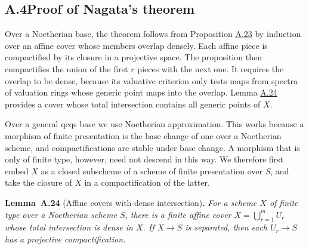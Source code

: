 \documentclass[11pt]{article}
\newenvironment{bpstatement}[2]{\par\addvspace{0.6\baselineskip}\noindent\textbf{#1}#2\textbf{.}\enspace\ignorespaces}
  {\par\addvspace{0.4\baselineskip}}
\newenvironment{bpstatementit}[2]{\begin{bpstatement}{#1}{#2}\itshape\ignorespaces}{\end{bpstatement}}
\begin{document}
\subsection*{\texorpdfstring{A.4\quad Proof of Nagata's theorem}{A.4 Proof of Nagata's theorem}}
\label{bp65}%
\label{bp66}%
Over a Noetherian base, the theorem follows from Proposition \hyperref[bp63]{A.23} by induction over an affine cover whose members overlap densely. Each affine piece is compactified by its closure in a projective space. The proposition then compactifies the union of the first \(r\) pieces with the next one. It requires the overlap to be dense, because its valuative criterion only tests maps from spectra of valuation rings whose generic point maps into the overlap. Lemma \hyperref[bp67]{A.24} provides a cover whose total intersection contains all generic points of \(X\).

Over a general qcqs base we use Noetherian approximation. This works because a morphism of finite presentation is the base change of one over a Noetherian scheme, and compactifications are stable under base change. A morphism that is only of finite type, however, need not descend in this way. We therefore first embed \(X\) as a closed subscheme of a scheme of finite presentation over \(S\), and take the closure of \(X\) in a compactification of the latter.

\label{bp67}%
\begin{bpstatementit}{Lemma~A.24}{ (Affine covers with dense intersection)}
For a scheme \(X\) of finite type over a Noetherian scheme \(S\), there is a finite affine cover \(X=\bigcup_{r=1}^m U_r\) whose total intersection is dense in \(X\). If \(X\to S\) is separated, then each \(U_r\to S\) has a projective compactification.
\end{bpstatementit}
\end{document}
